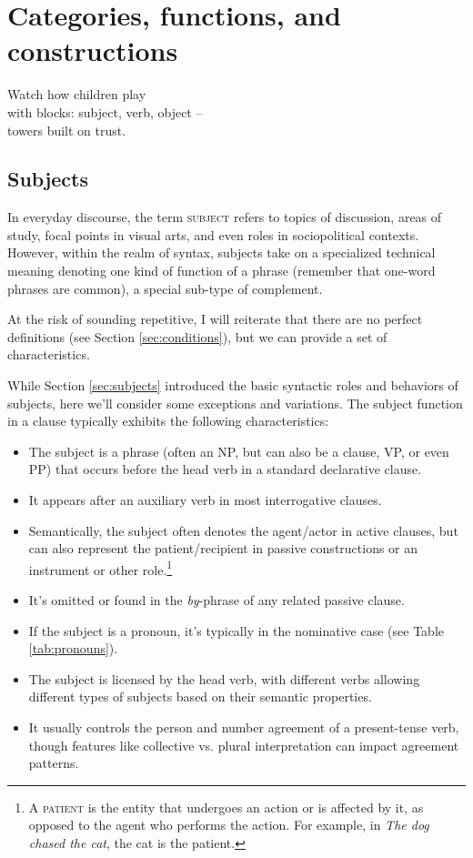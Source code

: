 \chapter{Categories, functions, and constructions}


\epigraph{Watch how children play\\
with blocks: subject, verb, object --\\
towers built on trust.}{}

\section{Subjects} \label{sec:subjects2}
In everyday discourse, the term \textsc{subject} refers to topics of discussion, areas of study, focal points in visual arts, and even roles in sociopolitical contexts. However, within the realm of syntax, subjects take on a specialized technical meaning denoting one kind of function of a phrase (remember that one-word phrases are common), a special sub-type of complement.

At the risk of sounding repetitive, I will reiterate that there are no perfect definitions (see Section \ref{sec:conditions}), but we can provide a set of characteristics.

While Section \ref{sec:subjects} introduced the basic syntactic roles and behaviors of subjects, here we'll consider some exceptions and variations. The subject function in a clause typically exhibits the following characteristics:

\begin{itemize}[noitemsep]
    \item The subject is a phrase (often an NP, but can also be a clause, VP, or even PP) that occurs before the head verb in a standard declarative clause.
    \item It appears after an auxiliary verb in most interrogative clauses.
    \item Semantically, the subject often denotes the agent/actor in active clauses, but can also represent the patient/recipient in passive constructions or an instrument or other role.\footnote{A \textsc{patient} is the entity that undergoes an action or is affected by it, as opposed to the agent who performs the action. For example, in \textit{The dog chased the cat}, the cat is the patient.}
    \item It's omitted or found in the \textit{by}-phrase of any related passive clause.
    \item If the subject is a pronoun, it's typically in the nominative case (see Table \ref{tab:pronouns}).
    \item The subject is licensed by the head verb, with different verbs allowing different types of subjects based on their semantic properties.
    \item It usually controls the person and number agreement of a present-tense verb, though features like collective vs. plural interpretation can impact agreement patterns.
\end{itemize}


